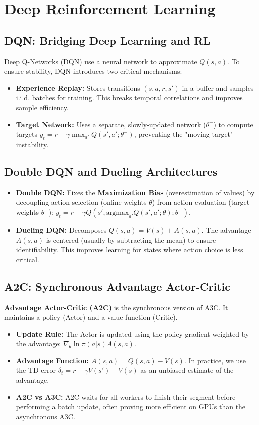 \section{Deep Reinforcement Learning}

\subsection{DQN: Bridging Deep Learning and RL}
Deep Q-Networks (DQN) use a neural network to approximate $Q(s, a)$. To ensure stability, DQN introduces two critical mechanisms:
\begin{itemize}
    \item \textbf{Experience Replay:} Stores transitions $(s, a, r, s')$ in a buffer and samples i.i.d. batches for training. This breaks temporal correlations and improves sample efficiency.
    \item \textbf{Target Network:} Uses a separate, slowly-updated network ($\theta^-$) to compute targets $y_t = r + \gamma \max_{a'} Q(s', a'; \theta^-)$, preventing the "moving target" instability.
\end{itemize}

\subsection{Double DQN and Dueling Architectures}
\begin{itemize}
    \item \textbf{Double DQN:} Fixes the \textbf{Maximization Bias} (overestimation of values) by decoupling action selection (online weights $\theta$) from action evaluation (target weights $\theta^-$): $y_t = r + \gamma Q(s', \text{argmax}_{a'} Q(s', a'; \theta); \theta^-)$.
    \item \textbf{Dueling DQN:} Decomposes $Q(s, a) = V(s) + A(s, a)$. The advantage $A(s, a)$ is centered (usually by subtracting the mean) to ensure identifiability. This improves learning for states where action choice is less critical.
\end{itemize}

\subsection{A2C: Synchronous Advantage Actor-Critic}
\textbf{Advantage Actor-Critic (A2C)} is the synchronous version of A3C. It maintains a policy (Actor) and a value function (Critic).
\begin{itemize}
    \item \textbf{Update Rule:} The Actor is updated using the policy gradient weighted by the advantage: $\nabla_\theta \ln \pi(a|s) A(s, a)$. 
    \item \textbf{Advantage Function:} $A(s, a) = Q(s, a) - V(s)$. In practice, we use the TD error $\delta_t = r + \gamma V(s') - V(s)$ as an unbiased estimate of the advantage.
    \item \textbf{A2C vs A3C:} A2C waits for all workers to finish their segment before performing a batch update, often proving more efficient on GPUs than the asynchronous A3C.
\end{itemize}

